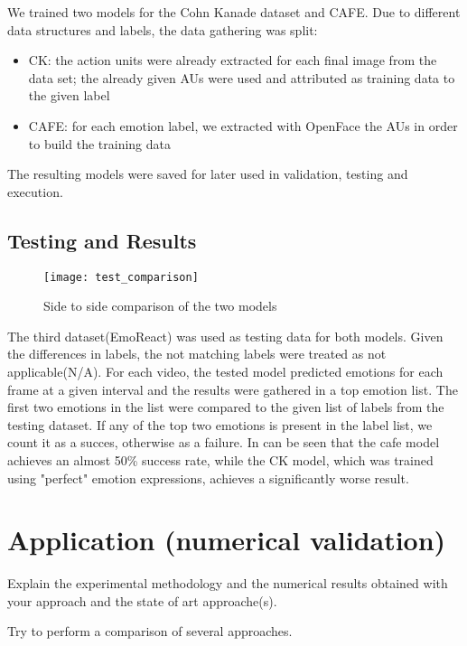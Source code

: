 \documentclass[runningheads,a4paper,11pt]{report}
\begin{document}
We trained two models for the Cohn Kanade dataset and CAFE. Due to different data structures and labels, the data gathering was split:
\begin{itemize}
    \item CK: the action units were already extracted for each final image from the data set; the already given AUs were used and attributed as training data to the given label
    \item CAFE: for each emotion label, we extracted with OpenFace the AUs in order to build the training data
\end{itemize}

The resulting models were saved for later used in validation, testing and execution.

\section{Testing and Results}

\begin{figure}[ht]
    \centering
    \texttt{[image: test\_comparison]}
    \caption{Side to side comparison of the two models}
    \label{fig:test_comparison}
\end{figure}

The third dataset(EmoReact) was used as testing data for both models. Given the differences in labels, the not matching labels were treated as not applicable(N/A). For each video, the tested model predicted emotions for each frame at a given interval and the results were gathered in a top emotion list. The first two emotions in the list were compared to the given list of labels from the testing dataset. If any of the top two emotions is present in the label list, we count it as a succes, otherwise as a failure. 
In \label{test_comparison} can be seen that the cafe model achieves an almost 50\% success rate, while the CK model, which was trained using "perfect" emotion expressions, achieves a significantly worse result.


\chapter{Application (numerical validation)}
\label{chapter:application}


Explain the experimental methodology and the numerical results obtained with your approach and the state of art approache(s).

Try to perform a comparison of several approaches.
\end{document}
